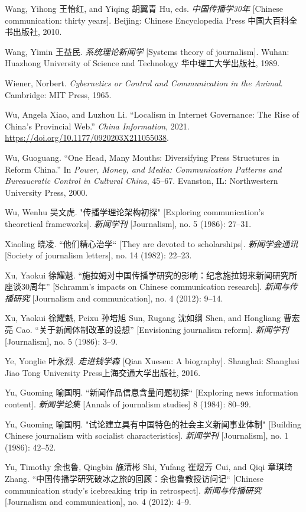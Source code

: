 \documentclass{tufte-handout}
\begin{document}
\begin{hangparas}{.25in}{1}
\begin{CJK*}{UTF8}{gbsn}
Wang, Yihong 王怡红, and Yiqing 胡翼青 Hu, eds. \emph{中国传播学30年}
{[}Chinese communication: thirty years{]}. Beijing: Chinese Encyclopedia
Press 中国大百科全书出版社, 2010.

Wang, Yimin 王益民. \emph{系统理论新闻学} {[}Systems theory of
journalism{]}. Wuhan: Huazhong University of Science and Technology
华中理工大学出版社, 1989.

Wiener, Norbert. \emph{Cybernetics or Control and Communication in the
Animal}. Cambridge: MIT Press, 1965.

Wu, Angela Xiao, and Luzhou Li. ``Localism in Internet Governance: The
Rise of China's Provincial Web.'' \emph{China Information}, 2021.
\url{https://doi.org/10.1177/0920203X211055038}.

Wu, Guoguang. ``One Head, Many Mouths: Diversifying Press Structures in
Reform China.'' In \emph{Power, Money, and Media: Communication Patterns
and Bureaucratic Control in Cultural China}, 45­--67. Evanston, IL:
Northwestern University Press, 2000.

Wu, Wenhu 吴文虎. "传播学理论架构初探" {[}Exploring communication's
theoretical frameworks{]}. \emph{新闻学刊} {[}Journalism{]}, no. 5
(1986): 27--31.

Xiaoling 晓凌. ``他们精心治学`` {[}They are devoted to scholarships{]}.
\emph{新闻学会通讯} {[}Society of journalism letters{]}, no. 14 (1982):
22--23.

Xu, Yaokui 徐耀魁.
``施拉姆对中国传播学研究的影响：纪念施拉姆来新闻研究所座谈30周年''
{[}Schramm's impacts on Chinese communication research{]}.
\emph{新闻与传播研究} {[}Journalism and communication{]}, no. 4 (2012):
9--14.

Xu, Yaokui 徐耀魁, Peixu 孙培旭 Sun, Rugang 沈如纲 Shen, and Hongliang
曹宏亮 Cao. ``关于新闻体制改革的设想'' {[}Envisioning journalism
reform{]}. \emph{新闻学刊} {[}Journalism{]}, no. 5 (1986): 3--9.

Ye, Yonglie 叶永烈. \emph{走进钱学森} {[}Qian Xuesen: A biography{]}.
Shanghai: Shanghai Jiao Tong University Press上海交通大学出版社, 2016.

Yu, Guoming 喻国明. ``新闻作品信息含量问题初探`` {[}Exploring news
information content{]}. \emph{新闻学论集} {[}Annals of journalism
studies{]} 8 (1984): 80--99.

Yu, Guoming 喻国明. "试论建立具有中国特色的社会主义新闻事业体制"
{[}Building Chinese journalism with socialist characteristics{]}.
\emph{新闻学刊} {[}Journalism{]}, no. 1 (1986): 42--52.

Yu, Timothy 余也鲁, Qingbin 施清彬 Shi, Yufang 崔煜芳 Cui, and Qiqi
章琪琦 Zhang. ``中国传播学研究破冰之旅的回顾：余也鲁教授访问记``
{[}Chinese communication study's icebreaking trip in retrospect{]}.
\emph{新闻与传播研究} {[}Journalism and communication{]}, no. 4 (2012):
4--9.


\end{CJK*}
\end{hangparas}
\end{document}
